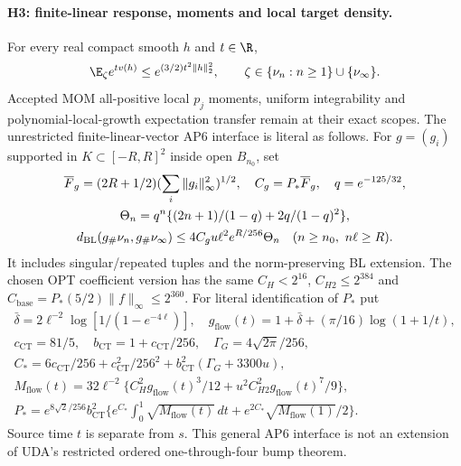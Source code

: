 \paragraph{H3: finite-linear response, moments and local target density.}
For every real compact smooth $h$ and $t\in\R$,
\[
 \E_\zeta e^{t v(h)}\le e^{(3/2)t^2\|h\|_2^2},\qquad
 \zeta\in\{\nu_n:n\ge1\}\cup\{\nu_\infty\}.
\]
Accepted MOM all-positive local $p_j$ moments, uniform integrability and
polynomial-local-growth expectation transfer remain at their exact scopes.
The unrestricted finite-linear-vector AP6 interface is literal as follows.
For $g=(g_i)$ supported in $K\subset[-R,R]^2$ inside open $B_{n_0}$, set
\begin{gather*}
 \overline F_g=(2R+1/2)(\sum_i\|g_i\|_\infty^2)^{1/2},\quad
 C_g=P_*\overline F_g,\quad q=e^{-125/32},\\
 \Theta_n=q^n\{(2n+1)/(1-q)+2q/(1-q)^2\},\\
 d_{\mathrm{BL}}(g_\#\nu_n,g_\#\nu_\infty)\le4C_gu\ell^2e^{R/256}\Theta_n
 \quad(n\ge n_0,\ n\ell\ge R).
\end{gather*}
It includes singular/repeated tuples and the norm-preserving BL extension.
The chosen OPT coefficient version has the same $C_H<2^{16}$,
$C_{H2}\le2^{384}$ and $C_{\mathrm{base}}=P_*(5/2)\|f\|_\infty\le2^{360}$.
For literal identification of $P_*$ put
\begin{gather*}
 \bar\delta=2\ell^{-2}\log[1/(1-e^{-4\ell})],\quad
 g_{\mathrm{flow}}(t)=1+\bar\delta+(\pi/16)\log(1+1/t),\\
 c_{\mathrm{CT}}=81/5,\quad b_{\mathrm{CT}}=1+c_{\mathrm{CT}}/256,\quad
 \Gamma_G=4\sqrt{2\pi}/256,\\
 C_*=6c_{\mathrm{CT}}/256+c_{\mathrm{CT}}^2/256^2
       +b_{\mathrm{CT}}^2(\Gamma_G+3300u),\\
 M_{\mathrm{flow}}(t)=32\ell^{-2}
 \{C_H^2g_{\mathrm{flow}}(t)^3/12+u^2C_{H2}^2g_{\mathrm{flow}}(t)^7/9\},\\
 P_*=e^{8\sqrt2/256}b_{\mathrm{CT}}^2
 \{e^{C_*}\int_0^1\sqrt{M_{\mathrm{flow}}(t)}\,dt
        +e^{2C_*}\sqrt{M_{\mathrm{flow}}(1)}/2\}.
\end{gather*}
Source time $t$ is separate from $s$. This general AP6 interface is not an
extension of UDA's restricted ordered one-through-four bump theorem.

